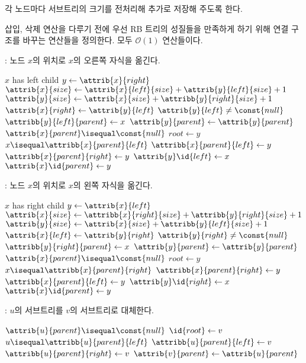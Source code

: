각 노드마다 서브트리의 크기를 전처리해 추가로 저장해 주도록 한다.

삽입, 삭제 연산을 다루기 전에 우선 RB 트리의 성질들을 만족하게 하기 위해 연결 구조를 바꾸는 연산들을 정의한다. 모두 $\mathcal{O}\left(1\right)$ 연산들이다.

: 노드 $x$의 위치로 $x$의 오른쪽 자식을 옮긴다.
\begin{codebox}
\li \If $x$ has left child \Then
\li \Return
    \End
\li $y \gets \attrib{x}{right}$
\li $\attrib{x}{size} \gets \attrib{x}{left}{size} + \attrib{y}{left}{size} + 1$
\li $\attrib{y}{size} \gets \attrib{x}{size} + \attribb{y}{right}{size} + 1$
\li $\attrib{x}{right} \gets \attrib{y}{left}$
\li \If $\attrib{y}{left} \neq \const{null}$ \Then
\li     $\attribb{y}{left}{parent} \gets x$
    \End
\li $\attrib{y}{parent} \gets \attrib{y}{parent}$
\li \If $\attrib{x}{parent} \isequal \const{null}$ \Then
\li     $root \gets y$
\li \ElseIf $x \isequal \attribb{x}{parent}{left}$ \Then
\li     $\attribb{x}{parent}{left} \gets y$
\li \ElseNoIf
\li     $\attribb{x}{parent}{right} \gets y$
    \End
\li $\attrib{y}\id{left} \gets x$
\li $\attrib{x}\id{parent} \gets y$
\end{codebox}

: 노드 $x$의 위치로 $x$의 왼쪽 자식을 옮긴다.
\begin{codebox}
\li \If $x$ has right child \Then
\li \Return
    \End
\li $y \gets \attrib{x}{left}$
\li $\attrib{x}{size} \gets \attribb{x}{right}{size} + \attribb{y}{right}{size} + 1$
\li $\attrib{y}{size} \gets \attrib{x}{size} + \attribb{y}{left}{size} + 1$
\li $\attrib{x}{left} \gets \attrib{y}{right}$
\li \If $\attrib{y}{right} \neq \const{null}$ \Then
\li     $\attribb{y}{right}{parent} \gets x$
    \End
\li $\attrib{y}{parent} \gets \attrib{y}{parent}$
\li \If $\attrib{x}{parent} \isequal \const{null}$ \Then
\li     $root \gets y$
\li \ElseIf $x \isequal \attribb{x}{parent}{right}$ \Then
\li     $\attribb{x}{parent}{right} \gets y$
\li \ElseNoIf
\li     $\attribb{x}{parent}{left} \gets y$
    \End
\li $\attrib{y}\id{right} \gets x$
\li $\attrib{x}\id{parent} \gets y$
\end{codebox}

: $u$의 서브트리를 $v$의 서브트리로 대체한다.

\begin{codebox}
\li \If $\attrib{u}{parent} \isequal \const{null}$ \Then
\li     $\id{root} \gets v$
\li \ElseIf $u \isequal \attribb{u}{parent}{left}$ \Then
\li     $\attribb{u}{parent}{left} \gets v$
\li \ElseNoIf
\li     $\attribb{u}{parent}{right} \gets v$
    \End
\li $\attrib{v}{parent} \gets \attrib{u}{parent}$
\end{codebox}


